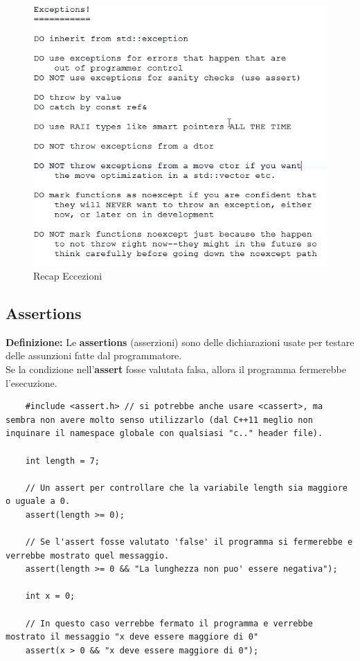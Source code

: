 \begin{figure}[H]
	\centering
	\includegraphics[width=1\textwidth, height=1\textheight, keepaspectratio]{./imgs/exceptions_recap2.png}
	\caption{Recap Eccezioni}
	\label{fig:exceptions_recap2}
\end{figure}

\subsection{Assertions}

\textsf{\small \textbf{Definizione: } Le \textbf{assertions} (asserzioni) sono delle dichiarazioni usate per testare delle assunzioni fatte dal programmatore.} \\

\textsf{\small Se la condizione nell'\textbf{assert} fosse valutata falsa, allora il programma fermerebbe l'esecuzione.} \\

\begin{lstlisting}
	#include <assert.h> // si potrebbe anche usare <cassert>, ma sembra non avere molto senso utilizzarlo (dal C++11 meglio non inquinare il namespace globale con qualsiasi "c.." header file).
	
	int length = 7;
	
	// Un assert per controllare che la variabile length sia maggiore o uguale a 0.
	assert(length >= 0);
	
	// Se l'assert fosse valutato 'false' il programma si fermerebbe e verrebbe mostrato quel messaggio.
	assert(length >= 0 && "La lunghezza non puo' essere negativa");
	
	int x = 0;
	
	// In questo caso verrebbe fermato il programma e verrebbe mostrato il messaggio "x deve essere maggiore di 0"
	assert(x > 0 && "x deve essere maggiore di 0"); 
\end{lstlisting}

